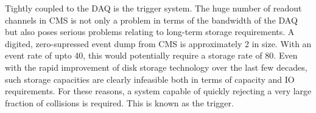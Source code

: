 Tightly coupled to the \ac{DAQ} is the trigger system. The huge number of
readout channels in \ac{CMS} is not only a problem in terms of the bandwidth of
the \ac{DAQ} but also poses serious problems relating to long-term storage
requirements. A digited, zero-supressed event dump from \ac{CMS} is
approximately \unit{2}{\mega\byte} in size. With an event rate of upto
\unit{40}{\mega\hertz}, this would potentially require a storage rate of
\unit{80}{\tera\byte\per\second}. Even with the rapid improvement of disk
storage technology over the last few decades, such storage capacities are
clearly infeasible both in terms of capacity and \ac{IO} requirements. For these
reasons, a system capable of quickly rejecting a very large fraction of
collisions is required. This is known as the trigger.

